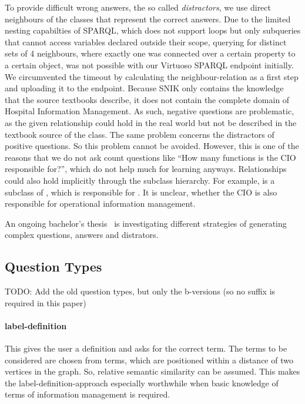\documentclass{IOS-Book-Article}     %
\newcommand{\citep}{\cite}%
\begin{document}
To provide difficult wrong answers, the so called \emph{distractors}, we use direct neighbours of the classes that represent the correct answers.
Due to the limited nesting capabilties of SPARQL, which does not support loops but only subqueries that cannot access variables declared outside their scope, querying for distinct sets of 4 neighbours, where exactly one was connected over a certain property to a certain object, was not possible with our Virtuoso SPARQL endpoint initially.
We circumvented the timeout by calculating the neighbour-relation as a first step and uploading it to the endpoint.
%
Because SNIK only contains the knowledge that the source textbooks describe, it does not contain the complete domain of Hospital Information Management.
As such, negative questions are problematic, as the given relationship could hold in the real world but not be described in the textbook source of the class.
The same problem concerns the distractors of positive questions.
So this problem cannot be avoided.
However, this is one of the reasons that we do not ask count questions like \enquote{How many functions is the CIO responsible for?}, which do not help much for learning anyways. %
Relationships could also hold implicitly through the subclass hierarchy.
For example,  is a subclass of , which is responsible for .
It is unclear, whether the CIO is also responsible for operational information management.

An ongoing bachelor's thesis~\citep{snikquiz} is investigating different strategies of generating complex questions, answers and distrators.

\subsection{Question Types}

TODO: Add the old question types, but only the b-versions (so no suffix is required in this paper)

\paragraph{label-definition}
This gives the user a definition and asks for  the correct term. The terms to be considered are chosen from terms, which are positioned within a distance of two vertices in the graph. So, relative semantic similarity can be assumed. This makes the label-definition-approach especially worthwhile when basic knowledge of terms of information management is required.
 
\end{document}
